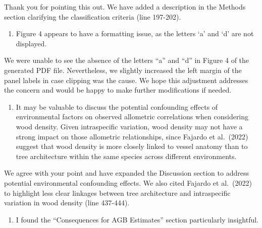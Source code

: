 \documentclass[
  12pt,
  letterpaper,
  DIV=11,
  numbers=noendperiod]{scrartcl}
\providecommand{\tightlist}{%
  \setlength{\itemsep}{0pt}\setlength{\parskip}{0pt}}\usepackage{longtable,booktabs,array}
\renewenvironment{quote}
  {\begin{customblockquote}\color{blockquote-text}\ignorespaces}
  {\end{customblockquote}}
\begin{document}
Thank you for pointing this out. We have added a description in the
Methods section clarifying the classification criteria (line 197-202).

\begin{quote}
\begin{enumerate}
\def\labelenumi{\arabic{enumi})}
\setcounter{enumi}{1}
\tightlist
\item
  Figure 4 appears to have a formatting issue, as the letters `a' and
  `d' are not displayed.
\end{enumerate}
\end{quote}

We were unable to see the absence of the letters ``a'' and ``d'' in
Figure 4 of the generated PDF file. Nevertheless, we slightly increased
the left margin of the panel labels in case clipping was the cause. We
hope this adjustment addresses the concern and would be happy to make
further modifications if needed.

\begin{quote}
\begin{enumerate}
\def\labelenumi{\arabic{enumi})}
\setcounter{enumi}{2}
\tightlist
\item
  It may be valuable to discuss the potential confounding effects of
  environmental factors on observed allometric correlations when
  considering wood density. Given intraspecific variation, wood density
  may not have a strong impact on those allometric relationships, since
  Fajardo et al.~(2022) suggest that wood density is more closely linked
  to vessel anatomy than to tree architecture within the same species
  across different environments.
\end{enumerate}
\end{quote}

We agree with your point and have expanded the Discussion section to
address potential environmental confounding effects. We also cited
Fajardo et al.~(2022) to highlight less clear linkages between tree
architecture and intraspecific variation in wood density (line 437-444).

\begin{quote}
\begin{enumerate}
\def\labelenumi{\arabic{enumi})}
\setcounter{enumi}{3}
\tightlist
\item
  I found the ``Consequences for AGB Estimates'' section particularly
  insightful.
\end{enumerate}
\end{quote}
\end{document}
